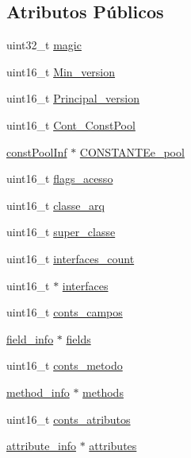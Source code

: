 \subsection*{Atributos Públicos}
\begin{DoxyCompactItemize}
\item 
uint32\-\_\-t \hyperlink{struct_classe_de_arquivo_a57331bb82cd19880ff79226bb2432fae}{magic}
\item 
uint16\-\_\-t \hyperlink{struct_classe_de_arquivo_a1a97a970253c7f8651cf450a5dbc98a7}{Min\-\_\-version}
\item 
uint16\-\_\-t \hyperlink{struct_classe_de_arquivo_a6f45d7c9f0026ebf84d4c83c46fcc547}{Principal\-\_\-version}
\item 
uint16\-\_\-t \hyperlink{struct_classe_de_arquivo_a86527645a99cde472e6ae443aaff7b4e}{Cont\-\_\-\-Const\-Pool}
\item 
\hyperlink{structconst_pool_inf}{const\-Pool\-Inf} $\ast$ \hyperlink{struct_classe_de_arquivo_a41c0d5758a7188709f83876e9577e134}{C\-O\-N\-S\-T\-A\-N\-T\-Ee\-\_\-pool}
\item 
uint16\-\_\-t \hyperlink{struct_classe_de_arquivo_a113235ae98d51c48780e11d39debf99f}{flags\-\_\-acesso}
\item 
uint16\-\_\-t \hyperlink{struct_classe_de_arquivo_ace786690df6e3ea741a18e3b49102e2b}{classe\-\_\-arq}
\item 
uint16\-\_\-t \hyperlink{struct_classe_de_arquivo_a250195b0cd2dfc88bf912da18aa9d558}{super\-\_\-classe}
\item 
uint16\-\_\-t \hyperlink{struct_classe_de_arquivo_a81969140a877d9eb2eda7616c58e2a4d}{interfaces\-\_\-count}
\item 
uint16\-\_\-t $\ast$ \hyperlink{struct_classe_de_arquivo_a7ab7e89f230794a963028b0e827ef878}{interfaces}
\item 
uint16\-\_\-t \hyperlink{struct_classe_de_arquivo_a11ed358daa97442f5d1e16f5acf4fbcc}{conts\-\_\-campos}
\item 
\hyperlink{structfield__info}{field\-\_\-info} $\ast$ \hyperlink{struct_classe_de_arquivo_a0a756640d8c9a35fb2068e4da70b0f9a}{fields}
\item 
uint16\-\_\-t \hyperlink{struct_classe_de_arquivo_a51e6aee87a53ffaec03f9fde63b33f35}{conts\-\_\-metodo}
\item 
\hyperlink{structmethod__info}{method\-\_\-info} $\ast$ \hyperlink{struct_classe_de_arquivo_a2b6a999458d5759967527d26a3219450}{methods}
\item 
uint16\-\_\-t \hyperlink{struct_classe_de_arquivo_aedc3f8105d268a28a6a02b39b28f8ddd}{conts\-\_\-atributos}
\item 
\hyperlink{structattribute__info}{attribute\-\_\-info} $\ast$ \hyperlink{struct_classe_de_arquivo_a9119e38492ee3cba2075867129584f66}{attributes}
\end{DoxyCompactItemize}


